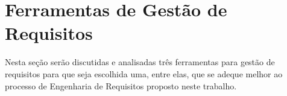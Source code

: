 \chapter[Ferramentas de Gestão de Requisitos]{Ferramentas de Gestão de Requisitos}
Nesta seção serão discutidas e analisadas três ferramentas para gestão de requisitos para que seja escolhida uma, entre elas, que se adeque 
melhor ao processo de Engenharia de Requisitos proposto neste trabalho.





